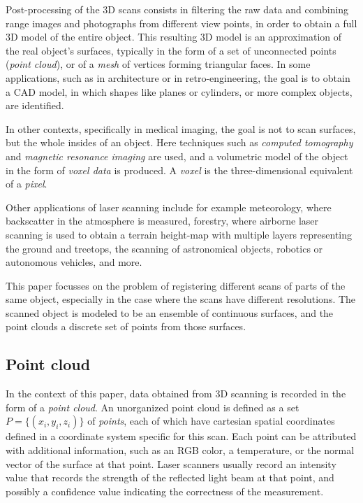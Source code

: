 Post-processing of the 3D scans consists in filtering the raw data and combining range images and photographs from different view points, in order to obtain a full 3D model of the entire object. This resulting 3D model is an approximation of the real object's surfaces, typically in the form of a set of unconnected points (\emph{point cloud}), or of a \emph{mesh} of vertices forming triangular faces. In some applications, such as in architecture or in retro-engineering, the goal is to obtain a CAD model, in which shapes like planes or cylinders, or more complex objects, are identified. 

In other contexts, specifically in medical imaging, the goal is not to scan surfaces, but the whole insides of an object. Here techniques such as \emph{computed tomography} and \emph{magnetic resonance imaging} are used, and a volumetric model of the object in the form of \emph{voxel data} is produced. A \emph{voxel} is the three-dimensional equivalent of a \emph{pixel}.

Other applications of laser scanning include for example meteorology, where backscatter in the atmosphere is measured, forestry, where airborne laser scanning is used to obtain a terrain height-map with multiple layers representing the ground and treetops, the scanning of astronomical objects, robotics \cite{Bibe2003} or autonomous vehicles, and more.

This paper focusses on the problem of registering different scans of parts of the same object, especially in the case where the scans have different resolutions. The scanned object is modeled to be an ensemble of continuous surfaces, and the point clouds a discrete set of points from those surfaces.


\subsection{Point cloud}
In the context of this paper, data obtained from 3D scanning is recorded in the form of a \emph{point cloud}. An unorganized point cloud is defined as a set $P = \{ (x_i, y_i, z_i) \}$ of \emph{points}, each of which have cartesian spatial coordinates defined in a coordinate system specific for this scan. Each point can be attributed with additional information, such as an RGB color, a temperature, or the normal vector of the surface at that point. Laser scanners usually record an intensity value that records the strength of the reflected light beam at that point, and possibly a confidence value indicating the correctness of the measurement.

